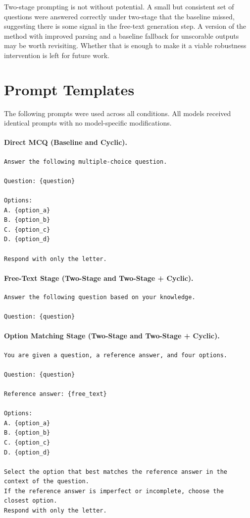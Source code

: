 \documentclass{article}
\begin{document}
Two-stage prompting is not without potential. A small but consistent set of questions were answered correctly under two-stage that the baseline missed, suggesting there is some signal in the free-text generation step. A version of the method with improved parsing and a baseline fallback for unscorable outputs may be worth revisiting. Whether that is enough to make it a viable robustness intervention is left for future work.
 


 
\appendix
 
\section{Prompt Templates}
\label{appendix:prompts}
 
The following prompts were used across all conditions. All models received identical prompts with no model-specific modifications.
 
\paragraph{Direct MCQ (Baseline and Cyclic).}
\begin{verbatim}
Answer the following multiple-choice question.
 
Question: {question}
 
Options:
A. {option_a}
B. {option_b}
C. {option_c}
D. {option_d}
 
Respond with only the letter.
\end{verbatim}
 
\paragraph{Free-Text Stage (Two-Stage and Two-Stage + Cyclic).}
\begin{verbatim}
Answer the following question based on your knowledge.
 
Question: {question}
\end{verbatim}
 
\paragraph{Option Matching Stage (Two-Stage and Two-Stage + Cyclic).}
\begin{verbatim}
You are given a question, a reference answer, and four options.
 
Question: {question}
 
Reference answer: {free_text}
 
Options:
A. {option_a}
B. {option_b}
C. {option_c}
D. {option_d}
 
Select the option that best matches the reference answer in the
context of the question.
If the reference answer is imperfect or incomplete, choose the
closest option.
Respond with only the letter.
\end{verbatim}
 
\end{document}
